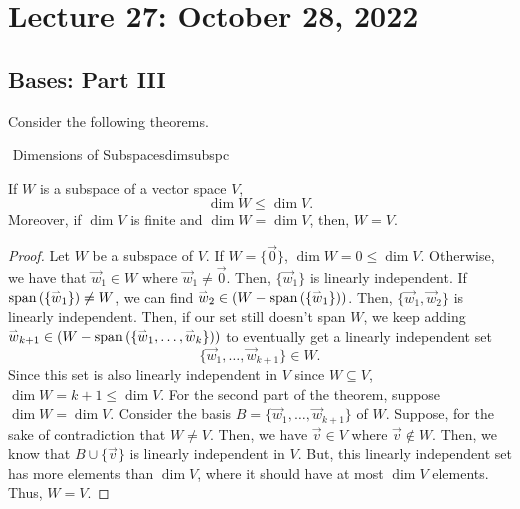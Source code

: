 \pagebreak

\section{Lecture 27: October 28, 2022}

    \subsection{Bases: Part III}

        Consider the following theorems.
        \begin{theorem}{\Stop\,\,Dimensions of Subspaces}{dimsubspc}

            If \(W\) is a subspace of a vector space \(V\),
            \begin{equation*}
                \dim W\leq \dim V.
            \end{equation*}
            Moreover, if \(\dim V\) is finite and \(\dim W=\dim V\), then, \(W=V\).
            \begin{proof}
                Let \(W\) be a subspace of \(V\). If \(W=\{\vec{0}\}\), \(\dim W=0\leq\dim V\). Otherwise, we have that \(\vec{w}_1\in W\) where \(\vec{w}_1\neq\vec{0}\). Then, \(\{\vec{w}_1\}\) is linearly independent. If \(\text{span\,}(\{\overset{_{\rightharpoonup}}{w}_1\})\neq W\), we can find \(\overset{_{\rightharpoonup}}{w}_2\in (W-\text{span\,}(\{\overset{_{\rightharpoonup}}{w}_1\}))\). Then, \(\{\vec{w}_1,\vec{w}_2\}\) is linearly independent. Then, if our set still doesn't span \(W\), we keep adding \(\overset{_{\rightharpoonup}}{w}_{k+1}\in (W-\text{span\,}(\{\overset{_{\rightharpoonup}}{w}_1,\ldots,\overset{_{\rightharpoonup}}{w}_k\}))\) to eventually get a linearly independent set
                \begin{equation*}
                    \{\vec{w}_1,\ldots,\vec{w}_{k+1}\}\in W.
                \end{equation*}
                Since this set is also linearly independent in \(V\) since \(W\subseteq V\), \(\dim W=k+1\leq \dim V\). For the second part of the theorem, suppose \(\dim W=\dim V\). Consider the basis \(B=\{\vec{w}_1,\ldots,\vec{w}_{k+1}\}\) of \(W\). Suppose, for the sake of contradiction that \(W\neq V\). Then, we have \(\vec{v}\in V\) where \(\vec{v}\nin W\). Then, we know that \(B\cup\{\vec{v}\}\) is linearly independent in \(V\). But, this linearly independent set has more elements than \(\dim V\), where it should have at most \(\dim V\) elements. Thus, \(W=V\).
            \end{proof}
            
        \end{theorem}
